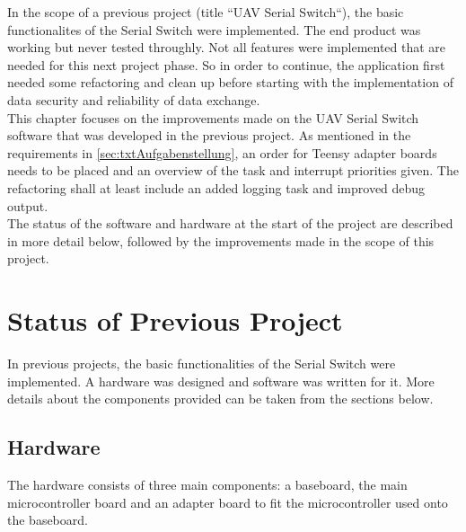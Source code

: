 %
In the scope of a previous project (title ``UAV Serial Switch``), the basic functionalites of the Serial Switch were implemented. The end product was working but never tested throughly. Not all features were implemented that are needed for this next project phase. So in order to continue, the application first needed some refactoring and clean up before starting with the implementation of data security and reliability of data exchange.\\
This chapter focuses on the improvements made on the UAV Serial Switch software that was developed in the previous project. As mentioned in the requirements in \autoref{sec:txtAufgabenstellung}, an order for Teensy adapter boards needs to be placed and an overview of the task and interrupt priorities given. The refactoring shall at least include an added logging task and improved debug output.\\
The status of the software and hardware at the start of the project are described in more detail below, followed by the improvements made in the scope of this project.
%
%
%
%
%
%
\section{Status of Previous Project}
In previous projects, the basic functionalities of the Serial Switch were implemented. A hardware was designed and software was written for it. More details about the components provided can be taken from the sections below.
%
%
%
\subsection{Hardware}
The hardware consists of three main components: a baseboard, the main microcontroller board and an adapter board to fit the microcontroller used onto the baseboard.
%
